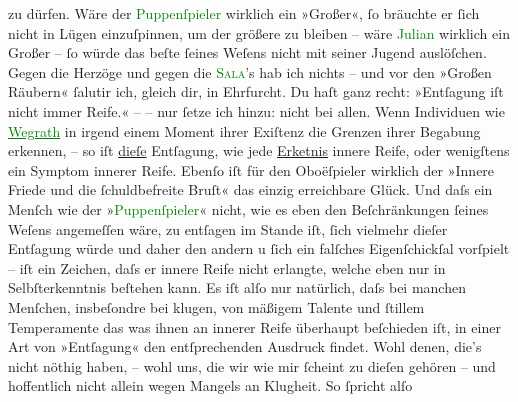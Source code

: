                zu dürfen. Wäre der \textcolor{green}{Puppen{\pb}ſpieler}{}
               wirklich ein »Großer«, ſo bräuchte er ſich nicht in Lügen einzuſpinnen, um der
               größere zu bleiben – wäre \textcolor{green}{Julian}{}
               wirklich ein Großer – ſo würde das beſte ſeines Weſens nicht mit seiner Jugend
               auslöſchen. Gegen die Herzöge und gegen die \textsc{\textcolor{green}{Sala}{}}’s hab ich nichts – und vor den »Großen Räubern« ſalutir ich, gleich dir, in
               Ehrfurcht. Du haſt ganz recht: »Entſagung iſt nicht immer Reife.« – – nur ſetze ich
               hinzu: nicht bei allen. Wenn Individuen wie \textcolor{green}{\uline{Wegrath}}{} in irgend einem Moment ihrer Exiſtenz die Grenzen ihrer Begabung erkennen, –
                  {\pb}so iſt \uline{dieſe} Entſagung, wie jede \uline{Erke{\geminationn}tnis} innere Reife, oder wenigſtens ein
               Symptom innerer Reife. Ebenſo iſt für den Oboëſpieler wirklich der »Innere Friede und
               die ſchuldbefreite Bruſt« das einzig erreichbare Glück. Und daſs ein Menſch wie der
                  »\textcolor{green}{Puppenſpieler}{}« nicht, wie es
               eben den Beſchränkungen ſeines Weſens angemeſſen wäre, \introOben{}zu\introOben{}
               entſagen im Stande iſt, ſich \introOben{}vielmehr\introOben{} dieſer Entſagung
                  \label{T_L01477_1v}\label{T_L01477_1h} würde
               und daher den andern u ſich ein \introOben{}falſches\introOben{} Eigenſchickſal
               vorſpielt – iſt ein Zeichen, daſs er innere Reife nicht erlangte, welche eben nur in
               Selbſterkenntnis beſtehen kann.  Es iſt {\pb}alſo nur natürlich,
               daſs bei manchen Menſchen, insbeſondre bei klugen, von mäßigem Talente und ſtillem
               Temperamente das was ihnen an innerer Reife überhaupt beſchieden iſt, in einer Art
               von »Entſagung« den entſprechenden Ausdruck findet.\pend
           \pstart
           Wohl denen, die’s nicht nöthig haben, – wohl uns, die wir wie mir ſcheint zu dieſen
               gehören – und hoffentlich nicht allein wegen Mangels an Klugheit. So ſpricht alſo
